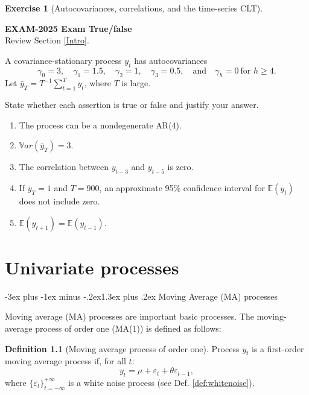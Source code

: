 \documentclass[
  11pt,
]{book}
\makeatletter
\providecommand{\tightlist}{%
  \setlength{\itemsep}{0pt}\setlength{\parskip}{0pt}}
\renewcommand\section{\@startsection{section}{1}{\z@}
  {-3ex plus -1ex minus -.2ex}{1.3ex plus .2ex}
  {\normalfont\Large\bfseries\color{TextbookInk}}}
\theoremstyle{definition}
\newtheorem{definition}{Definition}[chapter]
\theoremstyle{definition}
\theoremstyle{definition}
\newtheorem{exercise}{Exercise}[chapter]
\theoremstyle{definition}
\theoremstyle{remark}
\makeatother
\begin{document}
\begin{exercisebox}

\begin{exercise}[Autocovariances, correlations, and the time-series CLT]
\protect\hypertarget{exr:ex-exam2025-autocovariances-and-clt}{}\label{exr:ex-exam2025-autocovariances-and-clt}

\textbf{EXAM-2025 \textbar{} Exam \textbar{} True/false}\\
Review Section \ref{Intro}.

A covariance-stationary process \(y_t\) has autocovariances
\[
\gamma_0=3,\quad \gamma_1=1.5,\quad \gamma_2=1,\quad \gamma_3=0.5,
\quad\text{and}\quad \gamma_h=0\ \text{for }h\ge4.
\]
Let \(\bar y_T=T^{-1}\sum_{t=1}^T y_t\), where \(T\) is large.

State whether each assertion is true or false and justify your answer.

\begin{enumerate}
\def\labelenumi{\arabic{enumi}.}
\tightlist
\item
  The process can be a nondegenerate AR(4).
\item
  \(\mathbb{V}ar(\bar y_T)=3\).
\item
  The correlation between \(y_{t-3}\) and \(y_{t-5}\) is zero.
\item
  If \(\bar y_T=1\) and \(T=900\), an approximate 95\% confidence interval for \(\mathbb E(y_t)\) does not include zero.
\item
  \(\mathbb E(y_{t+1})=\mathbb E(y_{t-1})\).
\end{enumerate}

\end{exercise}

\end{exercisebox}

\chapter{Univariate processes}\label{Univariate}

\section{Moving Average (MA) processes}\label{moving-average-ma-processes}

Moving average (MA) processes are important basic processes. The moving-average process of order one (MA(1)) is defined as follows:

\begin{definition}[Moving average process of order one]
\protect\hypertarget{def:MA1}{}\label{def:MA1}Process \(y_t\) is a first-order moving average process if, for all \(t\):
\begin{equation}
y_t = \mu + \varepsilon_t + \theta \varepsilon_{t-1},\label{eq:MA1111}
\end{equation}
where \(\{\varepsilon_t\}_{t = -\infty}^{+\infty}\) is a white noise process (see Def. \ref{def:whitenoise}).
\end{definition}
\end{document}
